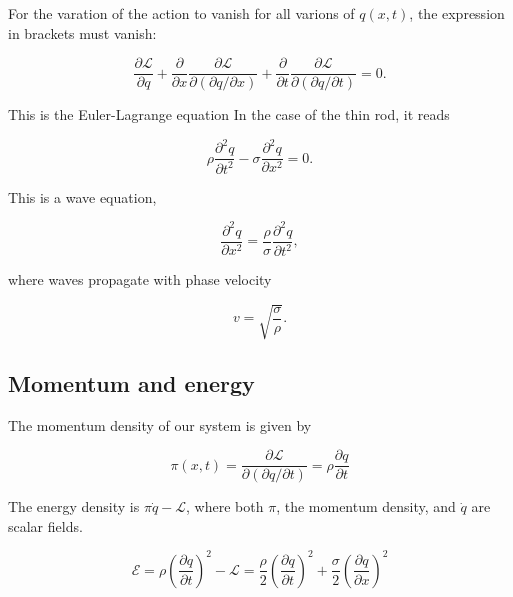 For the varation of the action to vanish for all varions of $q(x,t)$, the expression in brackets must vanish:

\begin{equation}
\frac{\partial \mathcal{L}}{\partial q}
+ \frac{\partial }{\partial x}\frac{\partial \mathcal{L}}{\partial (\partial q/\partial x) }
+  \frac{\partial}{\partial t}\frac{\partial \mathcal{L}}{\partial (\partial q/\partial t) } = 0 .
\end{equation}

This is the Euler-Lagrange equation
In the case of the thin rod, it reads

\begin{equation}
\rho\frac{\partial^2 q}{\partial t^2}
-  \sigma\frac{\partial^2 q}{\partial x^2}= 0 .
\end{equation}

This is a wave equation,

\begin{equation}
\frac{\partial^2 q}{\partial x^2}
= \frac{\rho}{\sigma}\frac{\partial^2 q}{\partial t^2} ,
\end{equation}

where waves propagate with phase velocity

\begin{equation}
v = \sqrt{\frac{\sigma}{\rho}} .
\end{equation}





\subsection{Momentum and energy}

The momentum density of our system is given by

\begin{equation}
\pi(x,t)
= \frac{\partial \mathcal{L}}{\partial (\partial q/\partial t)}
= \rho \frac{\partial q}{\partial t}
\end{equation}

The energy density is $\pi\dot q - \mathcal{L}$, where both $\pi$, the momentum density, and $\dot q$ are scalar fields.

\begin{equation}
\mathcal{E}
= \rho \left(\frac{\partial q}{\partial t} \right)^2 - \mathcal{L}
= \frac{\rho}{2}\left(\frac{\partial q}{\partial t} \right)^2
+
\frac{\sigma}{2} \left(\frac{\partial q}{\partial x} \right)^2
\end{equation}

